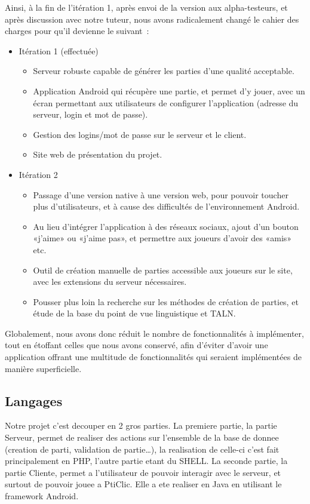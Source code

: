 \documentclass[a4paper,11pt,french]{article}
\def\android{Android\texttrademark{}}
\begin{document}
Ainsi, à la fin de l'itération 1, après envoi de la version aux alpha-testeurs, et après discussion avec notre tuteur, nous avons
radicalement changé le cahier des charges pour qu'il devienne le suivant~:
\begin{itemize}
\item Itération 1 (effectuée)
  \begin{itemize}
  \item Serveur robuste capable de générer les parties d'une qualité acceptable.
  \item Application \android{} qui récupère une partie, et permet d'y jouer, avec un écran permettant aux utilisateurs de configurer
    l'application (adresse du serveur, login et mot de passe).
  \item Gestion des logins/mot de passe sur le serveur et le client.
  \item Site web de présentation du projet.
  \end{itemize}
\item Itération 2
  \begin{itemize}
  \item Passage d'une version native à une version web, pour pouvoir toucher plus d'utilisateurs, et à cause des difficultés de l'environnement Android.
  \item Au lieu d'intégrer l'application à des réseaux sociaux, ajout d'un bouton «j'aime» ou «j'aime pas», et permettre aux joueurs d'avoir des «amis» etc.
  \item Outil de création manuelle de parties accessible aux joueurs sur le site, avec les extensions du serveur nécessaires.
  \item Pousser plus loin la recherche sur les méthodes de création de parties, et étude de la base du point de vue linguistique et TALN.
  \end{itemize}
\end{itemize}

Globalement, nous avons donc réduit le nombre de fonctionnalités à implémenter, tout en étoffant celles que nous avons conservé, afin
d'éviter d'avoir une application offrant une multitude de fonctionnalités qui seraient implémentées de manière superficielle.

\subsection{Langages}
Notre projet c'est decouper en 2 gros parties. La premiere partie, la \og{}partie Serveur\fg{}, permet de realiser des actions sur l'ensemble de la base de donnee (creation de parti, validation de partie\ldots),
la realisation de celle-ci c'est fait principalement en PHP, l'autre partie etant du SHELL.
La seconde partie, la \og{}partie Cliente\fg{}, permet a l'utilisateur de pouvoir interagir avec le serveur, et surtout de pouvoir jouee a PtiClic. Elle a ete realiser en Java en utilisant le framework \android{}.
\end{document}
